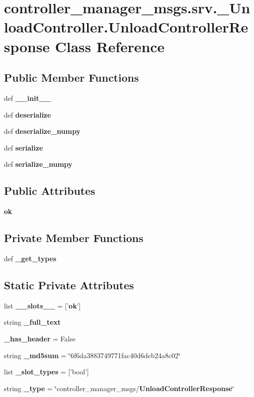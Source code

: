 \section{controller\-\_\-manager\-\_\-msgs.\-srv.\-\_\-\-Unload\-Controller.\-Unload\-Controller\-Response \-Class \-Reference}
\label{classcontroller__manager__msgs_1_1srv_1_1__UnloadController_1_1UnloadControllerResponse}
\subsection*{\-Public \-Member \-Functions}
\begin{DoxyCompactItemize}
\item 
def {\bf \-\_\-\-\_\-init\-\_\-\-\_\-}
\item 
def {\bf deserialize}
\item 
def {\bf deserialize\-\_\-numpy}
\item 
def {\bf serialize}
\item 
def {\bf serialize\-\_\-numpy}
\end{DoxyCompactItemize}
\subsection*{\-Public \-Attributes}
\begin{DoxyCompactItemize}
\item 
{\bf ok}
\end{DoxyCompactItemize}
\subsection*{\-Private \-Member \-Functions}
\begin{DoxyCompactItemize}
\item 
def {\bf \-\_\-get\-\_\-types}
\end{DoxyCompactItemize}
\subsection*{\-Static \-Private \-Attributes}
\begin{DoxyCompactItemize}
\item 
list {\bf \-\_\-\-\_\-slots\-\_\-\-\_\-} = ['{\bf ok}']
\item 
string {\bf \-\_\-full\-\_\-text}
\item 
{\bf \-\_\-has\-\_\-header} = \-False
\item 
string {\bf \-\_\-md5sum} = \char`\"{}6f6da3883749771fac40d6deb24a8c02\char`\"{}
\item 
list {\bf \-\_\-slot\-\_\-types} = ['bool']
\item 
string {\bf \-\_\-type} = \char`\"{}controller\-\_\-manager\-\_\-msgs/{\bf \-Unload\-Controller\-Response}\char`\"{}
\end{DoxyCompactItemize}


